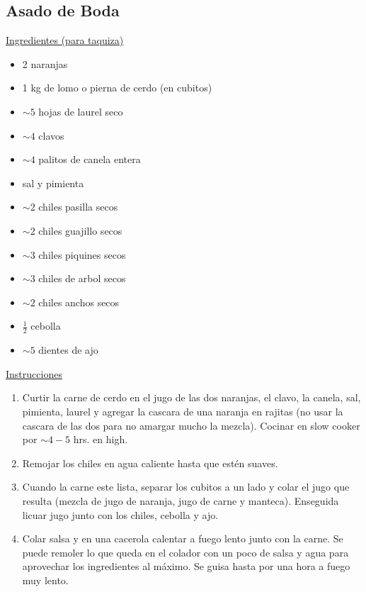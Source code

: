 \subsection{Asado de Boda}

\underline{Ingredientes (para taquiza)}
\begin{itemize}
\item 2 naranjas
\item 1 kg de lomo o pierna de cerdo (en cubitos)
\item $\sim 5$ hojas de laurel seco
\item $\sim 4$ clavos
\item $\sim 4$ palitos de canela entera
\item sal y pimienta
\item $\sim 2 $ chiles pasilla secos
\item $\sim 2 $ chiles guajillo secos
\item $\sim 3 $ chiles piquines secos
\item $\sim 3 $ chiles de arbol secos
\item $\sim 2 $ chiles anchos secos
\item $ \frac{1}{2}$ cebolla
\item $\sim 5 $ dientes de ajo
\end{itemize}

\underline{Instrucciones}
\begin{enumerate}
\item Curtir la carne de cerdo en el jugo de las dos naranjas, el clavo, la canela, sal, pimienta, laurel y agregar la cascara de una naranja en rajitas (no usar la cascara de las dos para no amargar mucho la mezcla). Cocinar en slow cooker por $\sim 4 - 5$ hrs. en high.
\item Remojar los chiles en agua caliente hasta que estén suaves.
\item Cuando la carne este lista, separar los cubitos a un lado y colar el jugo que resulta (mezcla de jugo de naranja, jugo de carne y manteca). Enseguida licuar jugo junto con los chiles, cebolla y ajo.  
\item Colar salsa y en una cacerola calentar a fuego lento junto con la carne. Se puede remoler lo que queda en el colador con un poco de salsa y agua para aprovechar los ingredientes al máximo. Se guisa hasta por una hora a fuego muy lento.
\end{enumerate}

